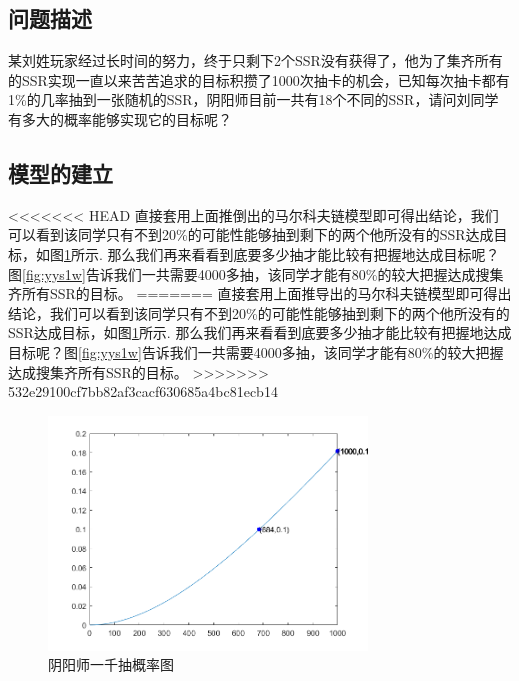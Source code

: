 \documentclass[10pt,journal,compsoc]{IEEEtran}
\begin{document}
\subsection{问题描述}
某刘姓玩家经过长时间的努力，终于只剩下2个SSR没有获得了，他为了集齐所有的SSR实现一直以来苦苦追求的目标积攒了1000次抽卡的机会，已知每次抽卡都有1\%的几率抽到一张随机的SSR，阴阳师目前一共有18个不同的SSR，请问刘同学有多大的概率能够实现它的目标呢？

\subsection{模型的建立}
<<<<<<< HEAD
直接套用上面推倒出的马尔科夫链模型即可得出结论，我们可以看到该同学只有不到20\%的可能性能够抽到剩下的两个他所没有的SSR达成目标，如图\ref{fig:yys1k}所示. 那么我们再来看看到底要多少抽才能比较有把握地达成目标呢？图\ref{fig:yys1w}告诉我们一共需要4000多抽，该同学才能有80\%的较大把握达成搜集齐所有SSR的目标。
=======
直接套用上面推导出的马尔科夫链模型即可得出结论，我们可以看到该同学只有不到20\%的可能性能够抽到剩下的两个他所没有的SSR达成目标，如图\ref{fig:yys1k}所示. 那么我们再来看看到底要多少抽才能比较有把握地达成目标呢？图\ref{fig:yys1w}告诉我们一共需要4000多抽，该同学才能有80\%的较大把握达成搜集齐所有SSR的目标。
>>>>>>> 532e29100cf7bb82af3cacf630685a4bc81ecb14

\begin{figure}[H]
  \centering
  \includegraphics[width=20pc]{img/yys1k.png}
  \caption{阴阳师一千抽概率图}
  \label{fig:yys1k}
\end{figure}
\end{document}
